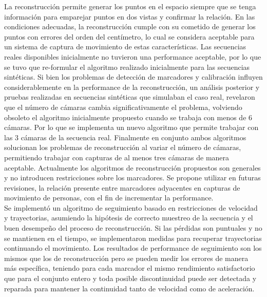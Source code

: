 La reconstrucción permite generar los puntos en el espacio siempre que se tenga información para emparejar puntos en dos vistas y confirmar la relación. En las condiciones adecuadas, la reconstrucción cumple con su cometido de generar los puntos con errores del orden del centímetro, lo cual se considera aceptable para un sistema de captura de movimiento de estas características. 
Las secuencias reales disponibles inicialmente no tuvieron una performance aceptable, por lo que se tuvo que re-formular el algoritmo realizado inicialmente para las secuencias sintéticas. Si bien los problemas de detección de marcadores y calibración influyen considerablemente en la performance de la reconstrucción, un análisis posterior y pruebas realizadas en secuencias sintéticas que simulaban el caso real, revelaron que el número de cámaras cambia significativamente el problema, volviendo obsoleto el algoritmo inicialmente propuesto cuando se trabaja con menos de 6 cámaras. Por lo que se implementa un nuevo algoritmo que permite trabajar con las 3 cámaras de la secuencia real.
Finalmente en conjunto ambos algoritmos solucionan los problemas de reconstrucción al variar el número de cámaras, permitiendo trabajar con capturas de al menos tres cámaras de manera aceptable. 
Actualmente los algoritmos de reconstrucción propuestos son generales y no introducen restricciones sobre los marcadores. Se propone utilizar en futuras revisiones, la relación presente entre marcadores adyacentes en capturas de movimiento de personas, con el fin de incrementar la performance. 
\\ 





Se implementó un algoritmo de seguimiento basado en restricciones de velocidad y trayectorias, asumiendo la hipótesis de correcto muestreo de la secuencia y el buen desempeño del proceso de reconstrucción. Si las pérdidas son puntuales y no se mantienen en el tiempo, se implementaron medidas para recuperar trayectorias continuando el movimiento. Los resultados de performance de seguimiento son los mismos que los de reconstrucción pero se pueden medir los errores de manera más específica, teniendo para cada marcador el mismo rendimiento satisfactorio que para el conjunto entero y toda posible discontinuidad puede ser detectada y reparada para mantener la continuidad tanto de velocidad como de aceleración. 
\\ 



